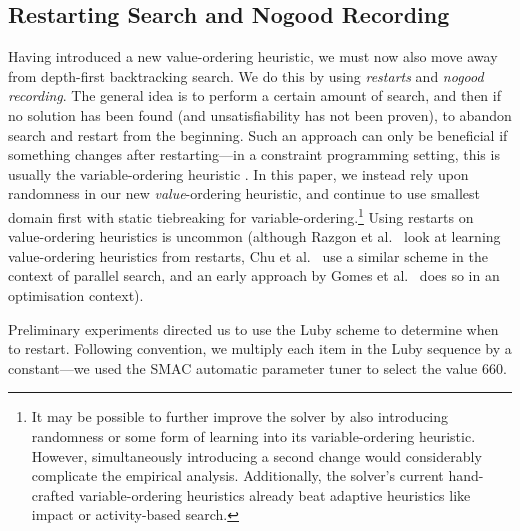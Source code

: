 \documentclass[runningheads]{llncs}
\newcommand{\siplineref}[1]{line~\ref{line:sip:#1}}
\newcommand{\citet}[2]{#1\cite{#2}}
\begin{document}
\subsection{Restarting Search and Nogood Recording}

Having introduced a new value-ordering heuristic, we must now also move away from depth-first
backtracking search. We do this by using \emph{restarts} and \emph{nogood recording}. The general
idea is to perform a certain amount of search, and then if no solution has been found (and
unsatisfiability has not been proven), to abandon search and restart from the beginning. Such an
approach can only be beneficial if something changes after restarting---in a constraint programming
setting, this is usually the variable-ordering heuristic
\cite{DBLP:journals/jsat/LecoutreSTV07,DBLP:conf/cp/GayHLS15,DBLP:conf/aaai/LeeSZ16,DBLP:conf/cp/GlorianBLLM17}.
In this paper, we instead rely upon randomness in our new \emph{value}-ordering heuristic, and
continue to use smallest domain first with static tiebreaking for variable-ordering.\footnote{It may
be possible to further improve the solver by also introducing randomness or some form of learning
into its variable-ordering heuristic. However, simultaneously introducing a second change would
considerably complicate the empirical analysis. Additionally, the solver's current hand-crafted
variable-ordering heuristics already beat adaptive heuristics like impact or activity-based search.}
Using restarts on value-ordering heuristics is uncommon (although \citet{Razgon et al.\
}{DBLP:conf/flairs/RazgonOP07} look at learning value-ordering heuristics from restarts, \citet{Chu
et al.\ }{DBLP:conf/cp/ChuSS09} use a similar scheme in the context of parallel search, and an early
approach by \citet{Gomes et al.\ }{DBLP:conf/aaai/GomesSK98} does so in an optimisation context).


Preliminary experiments directed us to use the Luby scheme \cite{DBLP:journals/ipl/LubySZ93} to
determine when to restart.
Following convention, we multiply each item in the Luby sequence by a constant---we used the SMAC
automatic parameter tuner \cite{DBLP:conf/lion/HutterHL11} to select the value 660.
\end{document}
